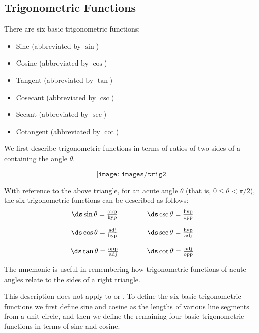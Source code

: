 \subsection{Trigonometric Functions}
There are six basic trigonometric functions:
\begin{multicols}{2}
\begin{itemize}
	\item Sine (abbreviated by $\sin$)
	\item Cosine (abbreviated by $\cos$)
	\item Tangent (abbreviated by $\tan$)
	\item Cosecant (abbreviated by $\csc$)
	\item Secant (abbreviated by $\sec$)
	\item Cotangent (abbreviated by $\cot$)
\end{itemize}
\end{multicols}

We first describe trigonometric functions in terms of ratios of two sides of a  containing the angle $\theta$. 

$$\texttt{[image: images/trig2]}$$

With reference to the above triangle, for an acute angle $\theta$ (that is, $0\leq\theta<\pi/2$), the six trigonometric functions can be described as follows:
$$\begin{array}{ccc}
\ds\sin\theta=\frac{\rm opp}{\rm hyp}&\qquad&\ds\csc\theta=\frac{\rm hyp}{\rm opp}\\
\\
\ds\cos\theta=\frac{\rm adj}{\rm hyp}&\qquad&\ds\sec\theta=\frac{\rm hyp}{\rm adj}\\
\\
\ds\tan\theta=\frac{\rm opp}{\rm adj}&\qquad&\ds\cot\theta=\frac{\rm adj}{\rm opp}\\
\end{array}$$

\begin{formulabox}[Mnemonic]
The mnemonic  is useful in remembering how trigonometric functions of acute angles relate to the sides of a right triangle.
\end{formulabox}

This description does not apply to  or .
To define the six basic trigonometric functions we first define sine and cosine as the lengths of various line segments from a unit circle, and then we define the remaining four basic trigonometric functions in terms of sine and cosine.


